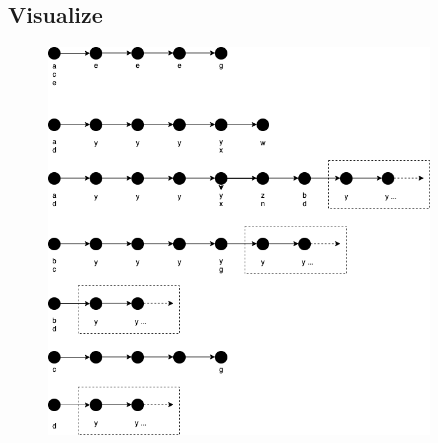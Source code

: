\subsection{Visualize}


\begin{figure}[h!]
	\centering \includegraphics[width=0.9\textwidth]{images/Q1-1.png}
\end{figure}